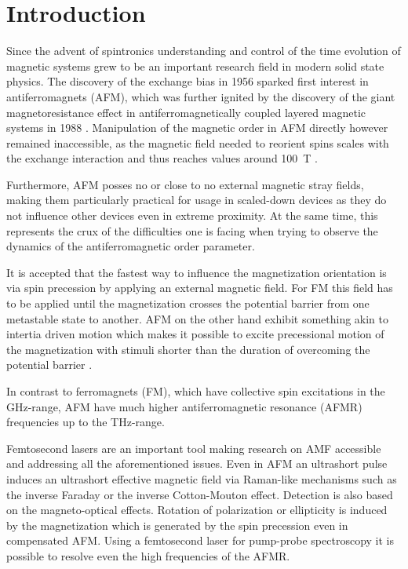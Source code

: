 \chapter{Introduction}
Since the advent of spintronics understanding and control of the time evolution of magnetic systems grew to be an important research field in modern solid state physics.
The discovery of the exchange bias in 1956 \cite{meiklejohn_new_1957} sparked first interest in antiferromagnets (AFM), which was further ignited by the discovery of the giant magnetoresistance effect in antiferromagnetically coupled layered magnetic systems in 1988 \cite{binasch_enhanced_1989, camley_theory_1989}.
Manipulation of the magnetic order in AFM directly however remained inaccessible, as the magnetic field needed to reorient spins scales with the exchange interaction and thus reaches values around \qty{100}{T} \cite{nemec_antiferromagnetic_2018}.

Furthermore, AFM posses no or close to no external magnetic stray fields, making them particularly practical for usage in scaled-down devices as they do not influence other devices even in extreme proximity.
At the same time, this represents the crux of the difficulties one is facing when trying to observe the dynamics of the antiferromagnetic order parameter.

It is accepted that the fastest way to influence the magnetization orientation is via spin precession by applying an external magnetic field.
For FM this field has to be applied until the magnetization crosses the potential barrier from one metastable state to another.
AFM on the other hand exhibit something akin to intertia driven motion which makes it possible to excite precessional motion of the magnetization with stimuli shorter than the duration of overcoming the potential barrier \cite{kimel_inertia-driven_2009}.

In contrast to ferromagnets (FM), which have collective spin excitations in the GHz-range, AFM have much higher antiferromagnetic resonance (AFMR) frequencies up to the THz-range.

Femtosecond lasers are an important tool making research on AMF accessible and addressing all the aforementioned issues.
Even in AFM an ultrashort pulse induces an ultrashort effective magnetic field via Raman-like mechanisms such as the inverse Faraday or the inverse Cotton-Mouton effect.
Detection is also based on the magneto-optical effects.
Rotation of polarization or ellipticity is induced by the magnetization which is generated by the spin precession even in compensated AFM\cite{nemec_antiferromagnetic_2018, bossini_femtosecond_2017}.
Using a femtosecond laser for pump-probe spectroscopy it is possible to resolve even the high frequencies of the AFMR.

